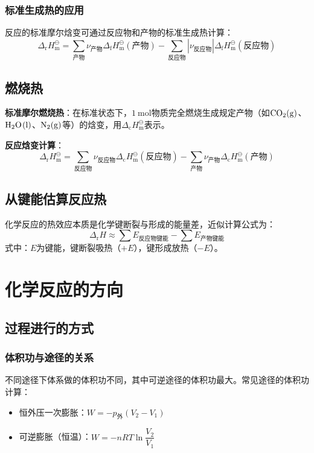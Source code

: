 \subsubsection{标准生成热的应用}
反应的标准摩尔焓变可通过反应物和产物的标准生成热计算：
\[
\Delta_{\text{r}}H_{\text{m}}^\ominus = \sum_{\text{产物}}\nu_{\text{产物}}\Delta_{\text{f}}H_{\text{m}}^\ominus(\text{产物}) - \sum_{\text{反应物}}\left|\nu_{\text{反应物}}\right|\Delta_{\text{f}}H_{\text{m}}^\ominus(\text{反应物})
\]

\subsection{燃烧热}
\textbf{标准摩尔燃烧热}：在标准状态下，$1~\text{mol}$物质完全燃烧生成规定产物（如$\ce{CO2(g)}$、$\ce{H2O(l)}$、$\ce{N2(g)}$等）的焓变，用$\Delta_{\text{c}}H_{\text{m}}^\ominus$表示。

\textbf{反应焓变计算}：
\[
\Delta_{\text{r}}H_{\text{m}}^\ominus = \sum_{\text{反应物}}\nu_{\text{反应物}}\Delta_{\text{c}}H_{\text{m}}^\ominus(\text{反应物}) - \sum_{\text{产物}}\nu_{\text{产物}}\Delta_{\text{c}}H_{\text{m}}^\ominus(\text{产物})
\]

\subsection{从键能估算反应热}
化学反应的热效应本质是化学键断裂与形成的能量差，近似计算公式为：
\[
\Delta_{\text{r}}H \approx \sum E_{\text{反应物键能}} - \sum E_{\text{产物键能}}
\]
式中：$E$为键能，键断裂吸热（$+E$），键形成放热（$-E$）。


\section{化学反应的方向}

\subsection{过程进行的方式}
\subsubsection{体积功与途径的关系}
不同途径下体系做的体积功不同，其中可逆途径的体积功最大。常见途径的体积功计算：
\begin{itemize}
    \item 恒外压一次膨胀：$W=-p_{\text{外}}(V_2-V_1)$
    \item 可逆膨胀（恒温）：$W=-nRT\ln\dfrac{V_2}{V_1}$
\end{itemize}

